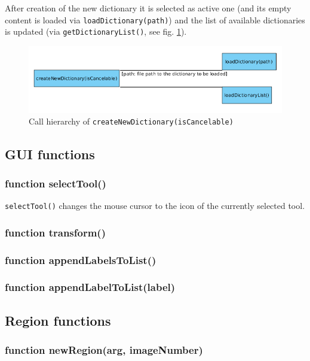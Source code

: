 After creation of the new dictionary it is selected as active one (and its empty content is loaded via \texttt{loadDictionary(path)}) and the list of available dictionaries is updated (via \texttt{getDictionaryList()}, see fig. \ref{figB_createDict}).

\begin{figure}[H]
	\begin{center}
		\includegraphics[scale=0.45]{img/ch_createDict.png}
		\caption{Call hierarchy of \texttt{createNewDictionary(isCancelable)}}
		\label{figB_createDict}
	\end{center}
\end{figure}


\subsection{GUI functions}

\subsubsection{function selectTool()}
\texttt{selectTool()} changes the mouse cursor to the icon of the currently selected tool.


\subsubsection{function transform()}
\subsubsection{function appendLabelsToList()}
\subsubsection{function appendLabelToList(label)}



\subsection{Region functions}
\subsubsection{function newRegion(arg, imageNumber)}



